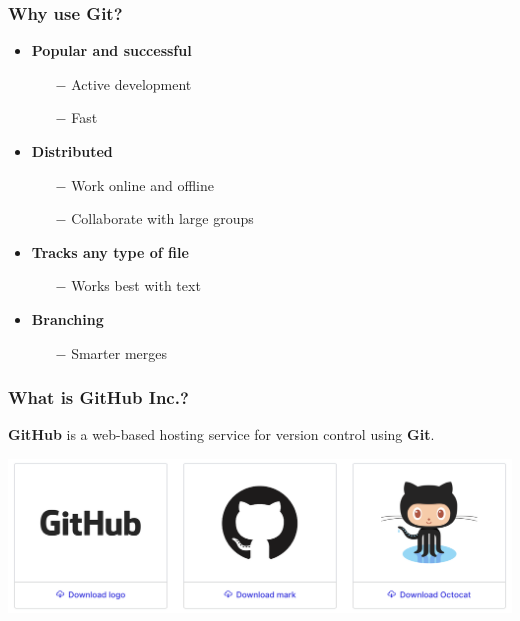 \documentclass{beamer}
\begin{document}
\begin{frame}
\frametitle{Why use Git?}
\begin{itemize}
    \item \textbf{Popular and successful}
      \begin{itemize}
      \item[$-$]{Active development}
      \item[$-$]{Fast}
      \hfill \break
      \end{itemize}
      
    \item \textbf{Distributed}
      \begin{itemize}
      \item[$-$]{Work online and offline}
      \item[$-$]{Collaborate with large groups}
      \hfill \break
      \end{itemize}
    
    \item \textbf{Tracks any type of file}
      \begin{itemize}
      \item[$-$]{Works best with text}
      \hfill \break
      \end{itemize}
    
    \item \textbf{Branching}
      \begin{itemize}
      \item[$-$]{Smarter merges}
      \end{itemize}
\end{itemize}
\end{frame}


\begin{frame}
\frametitle{What is GitHub Inc.?}

\begin{center}
\textbf{GitHub} is a web-based hosting service for version control using \textbf{Git}.
\end{center}

\begin{center}
\includegraphics[scale=0.2]{img/github_logos.png}
\end{center}
\end{frame}
\end{document}
